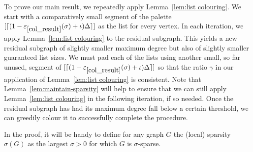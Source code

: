 \documentclass[11pt]{article}
\theoremstyle{plain}
\newcommand{\eps}{\varepsilon}
\begin{document}
To prove our main result, we repeatedly apply Lemma~\ref{lem:list colouring}.
We start with a comparatively small segment of the palette $[\lceil (1-\eps_{\ref{col_result}}(\sigma)+\iota)\Delta \rceil]$ as the list for every vertex.
In each iteration, we apply Lemma~\ref{lem:list colouring} to the residual subgraph. This yields a new residual subgraph of slightly smaller maximum degree but also of slightly smaller guaranteed list sizes.
We must pad each of the lists using another small, so far unused, segment of $[\lceil (1-\eps_{\ref{col_result}}(\sigma)+\iota)\Delta \rceil]$ so that the ratio $\gamma$ in our application of Lemma~\ref{lem:list colouring} is consistent.
Note that Lemma~\ref{lem:maintain-sparsity} will help to ensure that we can still apply Lemma~\ref{lem:list colouring} in the following iteration, if so needed.
Once the residual subgraph has had its maximum degree fall below a certain threshold, we can greedily colour it to successfully complete the procedure.

In the proof, it will be handy to define for any graph $G$ the (local) sparsity $\sigma(G)$ as the largest $\sigma>0$ for which $G$ is $\sigma$-sparse.
\end{document}
